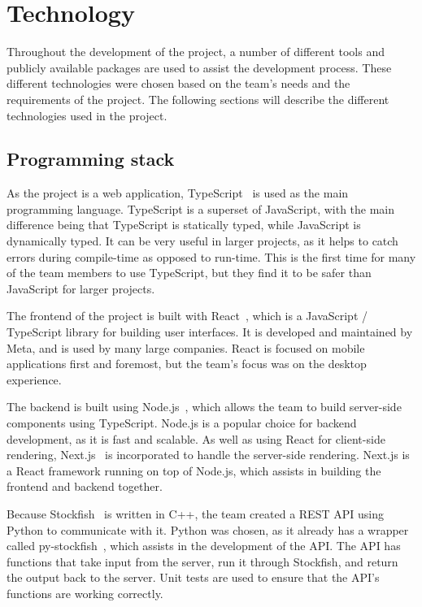 \section{Technology}\label{sec:technology}

Throughout the development of the project, a number of different tools and publicly available packages are used to
assist the development process.
These different technologies were chosen based on the team's needs and the requirements of the project.
The following sections will describe the different technologies used in the project.

\subsection{Programming stack}\label{subsec:programming}

As the project is a web application, TypeScript~\cite{typescript} is used as the main programming language.
TypeScript is a superset of JavaScript, with the main difference being that TypeScript is statically typed, while
JavaScript is dynamically typed.
It can be very useful in larger projects, as it helps to catch errors during compile-time as opposed to run-time.
This is the first time for many of the team members to use TypeScript, but they find it to be safer than JavaScript
for larger projects.

The frontend of the project is built with React~\cite{react}, which is a JavaScript / TypeScript library for building
user interfaces.
It is developed and maintained by Meta, and is used by many large companies.
React is focused on mobile applications first and foremost, but the team's focus was on the desktop experience.

The backend is built using Node.js~\cite{node.js}, which allows the team to build server-side components using
TypeScript.
Node.js is a popular choice for backend development, as it is fast and scalable.
As well as using React for client-side rendering, Next.js~\cite{next.js} is incorporated to handle the server-side
rendering.
Next.js is a React framework running on top of Node.js, which assists in building the frontend and backend
together.

Because Stockfish~\cite{stockfish} is written in C++, the team created a REST API using Python to communicate with it.
Python was chosen, as it already has a wrapper called py-stockfish~\cite{py-stockfish}, which assists in the development
of the API\@.
The API has functions that take input from the server, run it through Stockfish, and return the output back to the
server.
Unit tests are used to ensure that the API's functions are working correctly.

